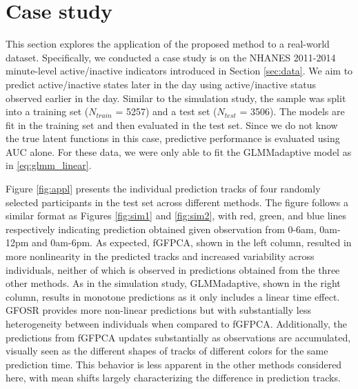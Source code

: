 \documentclass[12pt]{article}
\begin{document}
\section{Case study}
\label{sec:case_study}

This section explores the application of the proposed method to a real-world dataset. Specifically, we conducted a case study is on the NHANES 2011-2014 minute-level active/inactive indicators introduced in Section \ref{sec:data}. We aim to predict active/inactive states later in the day using active/inactive status observed earlier in the day. Similar to the simulation study, the sample was split into a training set ($N_{train}$ = 5257) and a test set ($N_{test}$ = 3506). The models are fit in the training set and then evaluated in the test set. Since we do not know the true latent functions in this case, predictive performance is evaluated using AUC alone. For these data, we were only able to fit the GLMMadaptive model as in \eqref{eq:glmm_linear}.

Figure \ref{fig:appl} presents the individual prediction tracks of four randomly selected participants in the test set across different methods. The figure follows a similar format as Figures \ref{fig:sim1} and \ref{fig:sim2}, with red, green, and blue lines respectively indicating prediction obtained given observation from 0-6am, 0am-12pm and 0am-6pm. As expected, fGFPCA, shown in the left column, resulted in more nonlinearity in the predicted tracks and increased variability across individuals, neither of which is observed in predictions obtained from the three other methods. As in the simulation study, GLMMadaptive, shown in the right column, results in monotone predictions as it only includes a linear time effect. GFOSR provides more non-linear predictions but with substantially less heterogeneity between individuals when compared to fGFPCA. Additionally, the predictions from fGFPCA updates substantially as observations are accumulated, visually seen as the different shapes of tracks of different colors for the same prediction time. This behavior is less apparent in the other methods considered here, with mean shifts largely characterizing the difference in prediction tracks.
\end{document}
